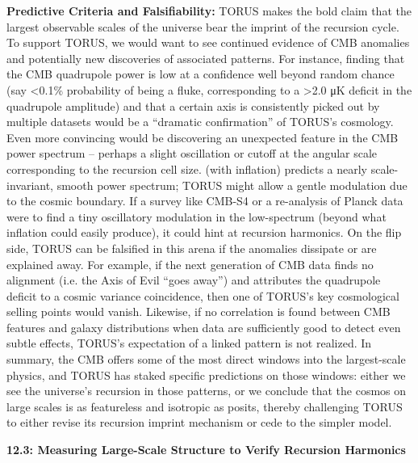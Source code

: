 \documentclass[
]{article}
\begin{document}
\textbf{Predictive Criteria and Falsifiability:} TORUS makes the bold
claim that the largest observable scales of the universe bear the
imprint of the recursion cycle. To support TORUS, we would want to see
continued evidence of CMB anomalies and potentially new discoveries of
associated patterns. For instance, finding that the CMB quadrupole power
is low at a confidence well beyond random chance (say \textless0.1\%
probability of being a fluke, corresponding to a \textgreater2.0 μK
deficit in the quadrupole amplitude) and that a certain axis is
consistently picked out by multiple datasets would be a ``dramatic
confirmation'' of TORUS's cosmology. Even more convincing would be
discovering an unexpected feature in the CMB power spectrum -- perhaps a
slight oscillation or cutoff at the angular scale corresponding to the
recursion cell size. \LambdaCDM (with inflation) predicts a nearly
scale-invariant, smooth power spectrum; TORUS might allow a gentle
modulation due to the cosmic boundary. If a survey like CMB-S4 or a
re-analysis of Planck data were to find a tiny oscillatory modulation in
the low-\ell spectrum (beyond what inflation could easily produce), it
could hint at recursion harmonics. On the flip side, TORUS can be
falsified in this arena if the anomalies dissipate or are explained
away. For example, if the next generation of CMB data finds no alignment
(i.e. the Axis of Evil ``goes away'') and attributes the quadrupole
deficit to a cosmic variance coincidence, then one of TORUS's key
cosmological selling points would vanish. Likewise, if no correlation is
found between CMB features and galaxy distributions when data are
sufficiently good to detect even subtle effects, TORUS's expectation of
a linked pattern is not realized. In summary, the CMB offers some of the
most direct windows into the largest-scale physics, and TORUS has staked
specific predictions on those windows: either we see the universe's
recursion in those patterns, or we conclude that the cosmos on large
scales is as featureless and isotropic as \LambdaCDM posits, thereby
challenging TORUS to either revise its recursion imprint mechanism or
cede to the simpler model.

\textbf{12.3: Measuring Large-Scale Structure to Verify Recursion
Harmonics}
\end{document}
